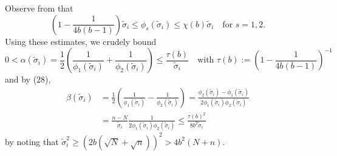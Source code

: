 \documentclass[reqno]{amsart}
\theoremstyle{plain}
\theoremstyle{definition}
\begin{document}


Observe from \cite[Eq. (31)]{Wang24} that 
\begin{equation}\label{eq:phiprodbd1}
\left(1-\frac{1}{4b(b-1)} \right) \widetilde\sigma_i \le \phi_s(\widetilde\sigma_i) \le \chi(b) \widetilde\sigma_i \quad\text{for } s=1,2.
\end{equation}
Using these estimates, we crudely bound $$0< \alpha(\widetilde \sigma_i)=\frac{1}{2}\left(\frac{1}{\phi_1(\widetilde \sigma_i)} + \frac{1}{\phi_2(\widetilde \sigma_i)} \right) \le \frac{\tau(b)}{\widetilde\sigma_i} \quad\text{with } \tau(b) :=\left(1-\frac{1}{4b(b-1)} \right)^{-1}$$  and by (28), 
\begin{align*}
\beta(\widetilde \sigma_i)&=\frac{1}{2}\left(\frac{1}{\phi_1(\widetilde \sigma_i)} - \frac{1}{\phi_2(\widetilde \sigma_i)} \right) = \frac{\phi_2(\widetilde \sigma_i) - \phi_1(\widetilde \sigma_i)}{2 \phi_1(\widetilde \sigma_i)  \phi_2(\widetilde \sigma_i) }\\
&= \frac{n-N}{\widetilde \sigma_i}\frac{1}{ 2\phi_1(\widetilde \sigma_i)  \phi_2(\widetilde \sigma_i)} \le \frac{\tau(b)^2}{8b^2\widetilde \sigma_i}
\end{align*}
by noting that $\widetilde \sigma_i^2 \ge (2b(\sqrt N + \sqrt n))^2> 4b^2(N+n)$. %
\end{document}
